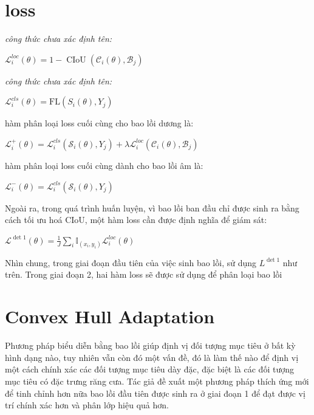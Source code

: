 \documentclass[12pt,a4paper,openany,oneside]{report}
\begin{document}
\section{loss}

\textit{công thức chưa xác định tên:}
\begin{center}
	$\mathcal{L}_i^{l o c}(\theta)=1-\operatorname{CIoU}\left(\mathcal{C}_i(\theta), \mathcal{B}_j\right)$
\end{center}
\textit{công thức chưa xác định tên:}
\begin{center}
	$\mathcal{L}_i^{c l s}(\theta)=\mathrm{FL}\left(S_i(\theta), Y_j\right)$
\end{center}

hàm phân loại loss cuối cùng cho bao lồi dương là:

\begin{center}
	$\mathcal{L}_i^{+}(\theta)=\mathcal{L}_i^{c l s}\left(\mathcal{S}_i(\theta), Y_j\right)+\lambda \mathcal{L}_i^{l o c}\left(\mathcal{C}_i(\theta), \mathcal{B}_j\right)$
\end{center}

hàm phân loại loss cuối cùng dành cho bao lồi âm là:

\begin{center}
	$\mathcal{L}_i^{-}(\theta)=\mathcal{L}_i^{c l s}\left(\mathcal{S}_i(\theta), Y_j\right)$
\end{center}
Ngoài ra, trong quá trình huấn luyện, vì bao lồi ban đầu chỉ được sinh ra bằng cách tối ưu hoá CIoU, một hàm loss cần được định nghĩa để giám sát:
\begin{center}
	$\mathcal{L}^{\operatorname{det} 1}(\theta)=\frac{1}{J} \sum_i \mathbb{I}_{\left(x_i, y_i\right)} \mathcal{L}_i^{l o c}(\theta)$
\end{center}
Nhìn chung, trong giai đoạn đầu tiên của việc sinh bao lồi, sử dụng $L^{\operatorname{det} 1}$ như trên. Trong giai đoạn 2, hai hàm loss sẽ được sử dụng để phân loại bao lồi
\section{Convex Hull Adaptation}
Phương pháp biểu diễn bằng bao lồi giúp định vị đối tượng mục tiêu ở bất kỳ hình dạng nào, tuy nhiên vẫn còn đó một vấn đề, đó là làm thế nào để định vị một cách chính xác các đối tượng mục tiêu dày đặc, đặc biệt là các đối tượng mục tiêu có đặc trưng răng cưa. Tác giả đề xuất một phương pháp thích ứng mới để tinh chỉnh hơn nữa bao lồi đầu tiên được sinh ra ở giai đoạn 1 để đạt được vị trí chính xác hơn và phân lớp hiệu quả hơn.
\end{document}
